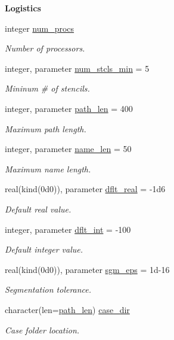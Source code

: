 \begin{Indent}\textbf{ Logistics}\par
\begin{DoxyCompactItemize}
\item 
integer \hyperlink{namespacem__global__parameters_aafb65952c33f1c363d1040bde29734ea}{num\+\_\+procs}
\begin{DoxyCompactList}\small\item\em Number of processors. \end{DoxyCompactList}\item 
integer, parameter \hyperlink{namespacem__global__parameters_a71f091e6074e6c248fd7e03218b89218}{num\+\_\+stcls\+\_\+min} = 5
\begin{DoxyCompactList}\small\item\em Mininum \# of stencils. \end{DoxyCompactList}\item 
integer, parameter \hyperlink{namespacem__global__parameters_aa9d578c318044b2f2ec990b5fc0dfab9}{path\+\_\+len} = 400
\begin{DoxyCompactList}\small\item\em Maximum path length. \end{DoxyCompactList}\item 
integer, parameter \hyperlink{namespacem__global__parameters_ac8252b115e717c6f1c8595be6f897df7}{name\+\_\+len} = 50
\begin{DoxyCompactList}\small\item\em Maximum name length. \end{DoxyCompactList}\item 
real(kind(0d0)), parameter \hyperlink{namespacem__global__parameters_a99ba7e33a1870ac89386d376e0d20526}{dflt\+\_\+real} = -\/1d6
\begin{DoxyCompactList}\small\item\em Default real value. \end{DoxyCompactList}\item 
integer, parameter \hyperlink{namespacem__global__parameters_a4e4e3806190a62a77cf6542f6d07dbbd}{dflt\+\_\+int} = -\/100
\begin{DoxyCompactList}\small\item\em Default integer value. \end{DoxyCompactList}\item 
real(kind(0d0)), parameter \hyperlink{namespacem__global__parameters_aec97838cc58623019b07ae47da7f4c1c}{sgm\+\_\+eps} = 1d-\/16
\begin{DoxyCompactList}\small\item\em Segmentation tolerance. \end{DoxyCompactList}\item 
character(len=\hyperlink{namespacem__global__parameters_aa9d578c318044b2f2ec990b5fc0dfab9}{path\+\_\+len}) \hyperlink{namespacem__global__parameters_a0b91e533fe3b3e112c42af4024014544}{case\+\_\+dir}
\begin{DoxyCompactList}\small\item\em Case folder location. \end{DoxyCompactList}\end{DoxyCompactItemize}
\end{Indent}
